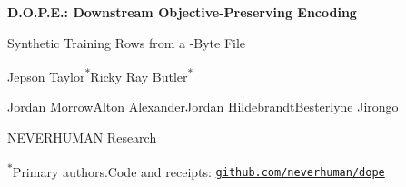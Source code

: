 \documentclass[10pt,letterpaper,twocolumn]{article}
\begin{document}
\onecolumn
\thispagestyle{front}
\vspace*{-0.40in}
\begin{center}
{\bfseries\fontsize{18.5}{22}\selectfont\color{ink}D.O.P.E.: Downstream Objective-Preserving Encoding\par}
\vspace{5pt}
{\fontsize{12.5}{15}\selectfont\color{ink}Synthetic Training Rows from a -Byte File\par}
\vspace{11pt}
{\fontsize{10.6}{14}\selectfont\color{ink}Jepson Taylor\textsuperscript{$\ast$}\hspace{2em}Ricky Ray Butler\textsuperscript{$\ast$}\par
Jordan Morrow\hspace{1.6em}Alton Alexander\hspace{1.6em}Jordan Hildebrandt\hspace{1.6em}Besterlyne Jirongo\par}
\vspace{4pt}
{\fontsize{9.8}{12}\selectfont\color{ink}NEVERHUMAN Research\par}
\vspace{3pt}
{\fontsize{8.6}{11}\selectfont\color{sub}\textsuperscript{$\ast$}Primary authors.\hspace{1.2em}Code and receipts: \href{https://github.com/neverhuman/dope}{\texttt{github.com/neverhuman/dope}}\par}
\end{center}
\vspace{7pt}
\end{document}
